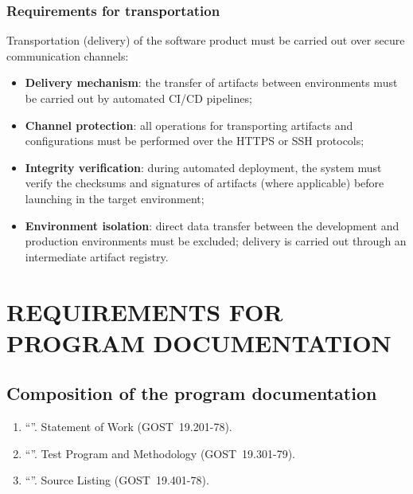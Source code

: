 \documentclass[12pt,a4paper]{extarticle}
\begin{document}
\subsubsection{Requirements for transportation}

\begin{hseExample}
Transportation (delivery) of the software product must be carried out over secure communication channels:
\begin{itemize}[nosep, leftmargin=1.25cm]
    \item \textbf{Delivery mechanism}: the transfer of artifacts between environments must be carried out by automated CI/CD pipelines;
    \item \textbf{Channel protection}: all operations for transporting artifacts and configurations must be performed over the HTTPS or SSH protocols;
    \item \textbf{Integrity verification}: during automated deployment, the system must verify the checksums and signatures of artifacts (where applicable) before launching in the target environment;
    \item \textbf{Environment isolation}: direct data transfer between the development and production environments must be excluded; delivery is carried out through an intermediate artifact registry.
\end{itemize}
\end{hseExample}

\clearpage

\section{REQUIREMENTS FOR PROGRAM DOCUMENTATION}

\subsection{Composition of the program documentation}
\label{sec:doc_composition}

\begin{enumerate}[label=\arabic*), leftmargin=1.25cm]
\item \enquote{\projectname}. Statement of Work (GOST~19.201-78).
\item \enquote{\projectname}. Test Program and Methodology (GOST~19.301-79).
\item \enquote{\projectname}. Source Listing (GOST~19.401-78).
\hseManualDocItems
\end{enumerate}
\end{document}
